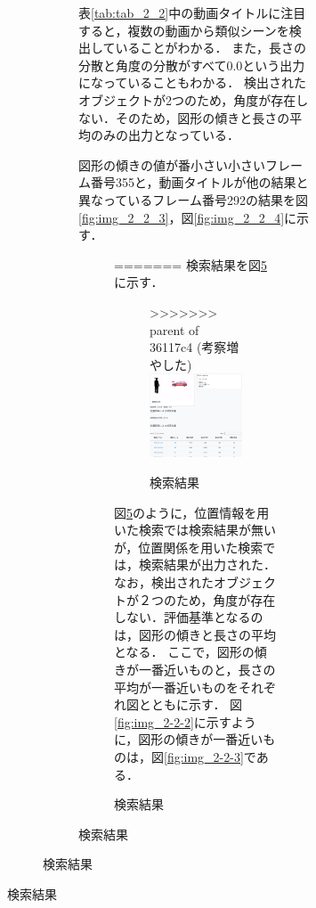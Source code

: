 \documentclass[a4j,12pt,dvipdfmx]{jreport}
\begin{document}
\begin{figure}[H]
\begin{figure}[H]
\begin{figure}[H]
表\ref{tab:tab_2_2}中の動画タイトルに注目すると，複数の動画から類似シーンを検出していることがわかる．
また，長さの分散と角度の分散がすべて0.0という出力になっていることもわかる．
検出されたオブジェクトが2つのため，角度が存在しない．そのため，図形の傾きと長さの平均のみの出力となっている．

図形の傾きの値が番小さい小さいフレーム番号355と，動画タイトルが他の結果と異なっているフレーム番号292の結果を図\ref{fig:img_2_2_3}，図\ref{fig:img_2_2_4}に示す．
\begin{figure}[H]
=======
検索結果を図\ref{fig:img_2-2-1}に示す．
\begin{figure}[b]
>>>>>>> parent of 36117c4 (考察増やした)
  \centering
  \includegraphics[width=13cm]{image/result_2_2_1.jpg}
  \caption{検索結果}
  \label{fig:img_2-2-1}
\end{figure}

図\ref{fig:img_2-2-1}のように，位置情報を用いた検索では検索結果が無いが，位置関係を用いた検索では，検索結果が出力された．
なお，検出されたオブジェクトが２つのため，角度が存在しない．評価基準となるのは，図形の傾きと長さの平均となる．
ここで，図形の傾きが一番近いものと，長さの平均が一番近いものをそれぞれ図とともに示す．
図\ref{fig:img_2-2-2}に示すように，図形の傾きが一番近いものは，図\ref{fig:img_2-2-3}である．


\end{figure}
\end{figure}
\end{figure}
\end{figure}
\end{document}
